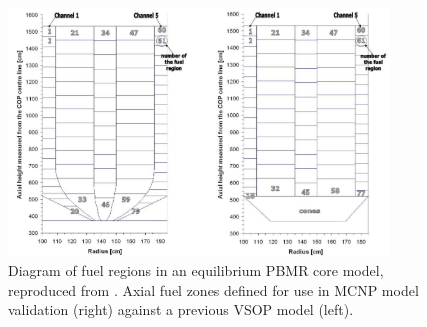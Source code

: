 \begin{figure}[H]
\centering
\includegraphics[width = 0.9\textwidth]{figures/bench-fuel-regions.png}
\caption[Diagram of fuel regions in an equilibrium PBMR core model]{Diagram of fuel regions in an equilibrium PBMR core model, reproduced from \cite{albornoz_mcnp_nodate}.  Axial fuel zones defined for use in MCNP model validation (right) against a previous VSOP model (left).}
\label{fig:fuel-regions}
\end{figure}